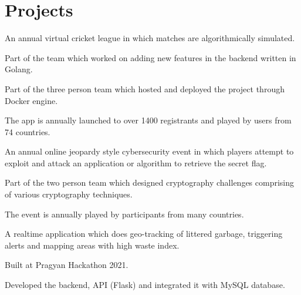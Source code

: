 \documentclass[]{deedy-resume-openfont}
\begin{document}
\hfill
\begin{minipage}[t]{0.66\textwidth} 


\section{Projects}
\vspace{\topsep}
\begin{tightemize}
\item An annual virtual cricket league in which matches are algorithmically simulated.
\item Part of the team which worked on adding new features in the backend written in Golang.
\item Part of the three person team which hosted and deployed the project through Docker engine.
\item The app is annually launched to over 1400 registrants and played by users from 74 countries.
\end{tightemize}
\sectionsep

\begin{tightemize}
\item An annual online jeopardy style cybersecurity event in which players attempt to exploit and attack an application or algorithm to retrieve the secret flag.
\item Part of the two person team which designed cryptography challenges comprising of various cryptography techniques.
\item The event is annually played by participants from many countries.
\end{tightemize}
\sectionsep

\begin{tightemize}
\item A realtime application which does geo-tracking of littered garbage, triggering alerts and mapping areas with high waste index.
\item Built at Pragyan Hackathon 2021.
\item Developed the backend, API (Flask) and integrated it with MySQL database.
\end{tightemize}
\sectionsep


\end{minipage}
\end{document}
